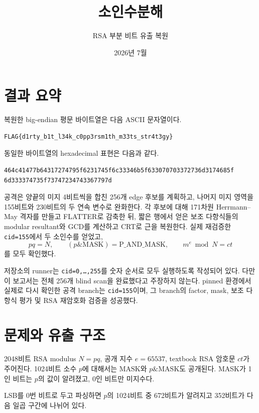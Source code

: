 \documentclass[10pt,a4paper]{article}
\title{소인수분해}
\author{RSA 부분 비트 유출 복원}
\date{2026년 7월}
\begin{document}
\maketitle

\section*{결과 요약}

복원한 big-endian 평문 바이트열은 다음 ASCII 문자열이다.

\begin{lstlisting}
FLAG{d1rty_b1t_l34k_c0pp3rsm1th_m33ts_str4t3gy}
\end{lstlisting}

동일한 바이트열의 hexadecimal 표현은 다음과 같다.

\begin{lstlisting}
464c41477b64317274795f6231745f6c33346b5f633070703372736d3174685f
6d333374735f73747234743367797d
\end{lstlisting}

공격은 양끝의 미지 4비트씩을 합친 256개 edge 후보를 계획하고, 나머지
미지 영역을 155비트와 230비트의 두 연속 변수로 완화한다. 각 후보에 대해
171차원 Herrmann--May 격자를 만들고 FLATTER로 감축한 뒤, 짧은 행에서
얻은 보조 다항식들의 modular resultant와 GCD를 계산하고 CRT로 근을
복원한다. 실제 재검증한 \texttt{cid=155}에서 두 소인수를 얻었고,
\[
  pq=N,\qquad (p\mathbin{\&}\mathrm{MASK})=\mathrm{P\_AND\_MASK},
  \qquad m^e\bmod N=ct
\]
를 모두 확인했다.

저장소의 runner는 \texttt{cid=0,\ldots,255}를 숫자 순서로 모두 실행하도록
작성되어 있다. 다만 이 보고서는 전체 256개 blind scan을 완료했다고
주장하지 않는다. pinned 환경에서 실제로 다시 확인한 공격 branch는
\texttt{cid=155}이며, 그 branch의 factor, mask, 보조 다항식 평가 및 RSA
재암호화 검증을 성공했다.

\section{문제와 유출 구조}

2048비트 RSA modulus \(N=pq\), 공개 지수 \(e=65537\), textbook RSA
암호문 \(ct\)가 주어진다. 1024비트 소수 \(p\)에 대해서는
\(\mathrm{MASK}\)와 \(p\mathbin{\&}\mathrm{MASK}\)도 공개된다.
MASK가 1인 비트는 \(p\)의 값이 알려졌고, 0인 비트만 미지수다.

LSB를 0번 비트로 두고 파싱하면 \(p\)의 1024비트 중 672비트가 알려지고
352비트가 다음 일곱 구간에 나뉘어 있다.
\end{document}
